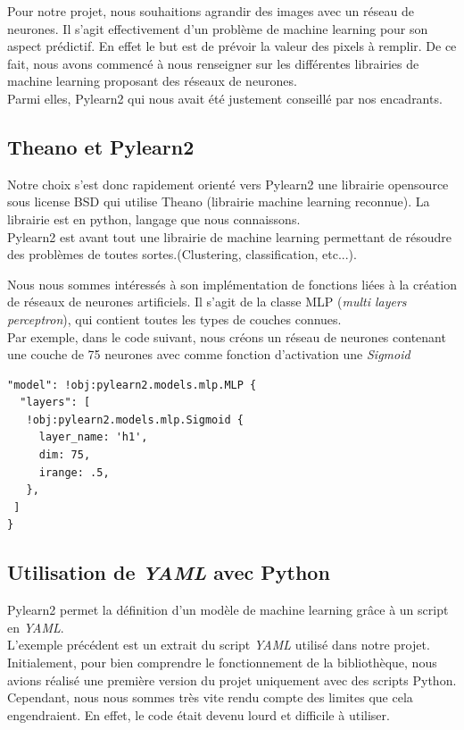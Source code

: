 \documentclass[12pt, a4paper]{article}
\begin{document}
Pour notre projet, nous souhaitions agrandir des images avec un réseau de neurones. Il s'agit effectivement d'un problème de machine learning pour son aspect prédictif. En effet le but est de prévoir la valeur des pixels à remplir. De ce fait, nous avons commencé à nous renseigner sur les différentes librairies de machine learning proposant des réseaux de neurones. \\ Parmi elles, Pylearn2 qui nous avait été justement conseillé par nos encadrants. 

\subsection{Theano et Pylearn2}
Notre choix s'est donc rapidement orienté vers Pylearn2 une librairie opensource sous license BSD qui utilise Theano (librairie machine learning reconnue). La librairie est en python, langage que nous connaissons. 
\\

Pylearn2 est avant tout une librairie de machine learning permettant de résoudre des problèmes de toutes sortes.(Clustering, classification, etc...).

Nous nous sommes intéressés à son implémentation de fonctions liées à la création de réseaux de neurones artificiels. Il s'agit de la classe MLP (\emph{multi layers perceptron}), qui contient toutes les types de couches connues. \\ Par exemple, dans le code suivant, nous créons un réseau de neurones contenant une couche de 75 neurones avec comme fonction d'activation une \emph{Sigmoid}

\begin{verbatim}
"model": !obj:pylearn2.models.mlp.MLP {
  "layers": [
   !obj:pylearn2.models.mlp.Sigmoid {
     layer_name: 'h1',
     dim: 75,
     irange: .5,
   },
 ]
}
\end{verbatim}

\subsection{Utilisation de \emph{YAML} avec Python}
Pylearn2 permet la définition d'un modèle de machine learning grâce à un script en \emph{YAML}.\\ L'exemple précédent est un extrait du script \emph{YAML} utilisé dans notre projet. 
\\

Initialement, pour bien comprendre le fonctionnement de la bibliothèque, nous avions réalisé une première version du projet uniquement avec des scripts Python. 
\\ Cependant, nous nous sommes très vite rendu compte des limites que cela engendraient. En effet, le code était devenu lourd et difficile à utiliser. 
\\
\end{document}
